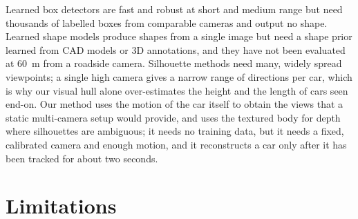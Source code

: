 \documentclass[runningheads,a4paper]{llncs}
\begin{document}


Learned box detectors \cite{smoke,monodle,bevheight} are fast and robust at short and medium range but need
thousands of labelled boxes from comparable cameras and output no shape. Learned shape models
\cite{kar2015,deepmanta,rcnn3d} produce shapes from a single image but need a shape prior learned from CAD models or
3D annotations, and they have not been evaluated at 60~m from a roadside camera. Silhouette methods
\cite{laurentini,spacecarving} need many, widely spread viewpoints; a single high camera gives a narrow range of
directions per car, which is why our visual hull alone over-estimates the height and the length of cars seen end-on.
Our method uses the motion of the car itself to obtain the views that a static multi-camera setup would provide, and
uses the textured body for depth where silhouettes are ambiguous; it needs no training data, but it needs a fixed,
calibrated camera and enough motion, and it reconstructs a car only after it has been tracked for about two seconds.

\section{Limitations}\label{sec:limits}
\end{document}
